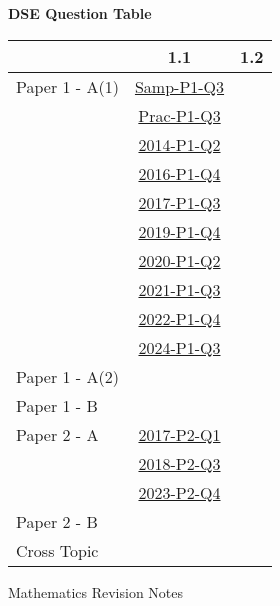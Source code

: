 \documentclass[12pt, a4paper]{article}
\begin{document}
\begin{absolutelynopagebreak}
\begin{center}
\textbf{DSE Question Table}
\end{center}
\begin{center}
\begin{tabular}{|l|c|c|}
\hline
        & 1.1 & 1.2 \\\hline
\hline
Paper 1 - A(1)& \hyperref[DSE2012S-CoreP1-Q03]{Samp-P1-Q3} &  \\
& \hyperref[DSE2012P-CoreP1-Q03]{Prac-P1-Q3} &  \\
& \hyperref[DSE2014-CoreP1-Q02]{2014-P1-Q2} &  \\
& \hyperref[DSE2016-CoreP1-Q04]{2016-P1-Q4} &  \\
& \hyperref[DSE2017-CoreP1-Q03]{2017-P1-Q3} &  \\
& \hyperref[DSE2019-CoreP1-Q04]{2019-P1-Q4} &  \\
& \hyperref[DSE2020-CoreP1-Q02]{2020-P1-Q2} &  \\
& \hyperref[DSE2021-CoreP1-Q03]{2021-P1-Q3} &  \\
& \hyperref[DSE2022-CoreP1-Q04]{2022-P1-Q4} &  \\
& \hyperref[DSE2024-CoreP1-Q03]{2024-P1-Q3} &  \\
\hline
Paper 1 - A(2)&  &  \\
\hline
Paper 1 - B&  &  \\
\hline
\hline
Paper 2 - A& \hyperref[DSE2017-CoreP2-Q01]{2017-P2-Q1} &  \\
& \hyperref[DSE2018-CoreP2-Q03]{2018-P2-Q3} &  \\
& \hyperref[DSE2023-CoreP2-Q04]{2023-P2-Q4} &  \\
\hline
Paper 2 - B&  &  \\
\hline
\hline
Cross Topic&  &  \\
\hline
\end{tabular}
\end{center}
\end{absolutelynopagebreak}
\newpage
\newpage
\thispagestyle{empty}
\begin{center}
Mathematics Revision Notes\\\vspace{1cm}
\\\vspace{1cm}
{\fontsize{24pt}{24pt}\selectfont {Linear Inequalities in One Unknown}} \\\vspace{1cm}
\label{chapter:S3-2}

\end{center}
\vspace{0.5cm}
\hline
\end{document}
